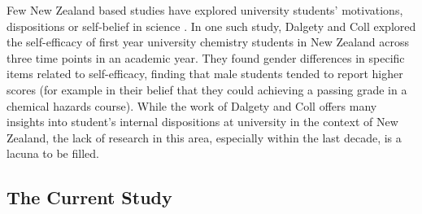 \documentclass[smallextended]{svjour3}       %
\begin{document}
Few New Zealand based studies have explored university students' motivations, dispositions or self-belief in science \cite{dalgety2006exploring,murphy2018determinants}. In one such study, Dalgety and Coll \citeyear{dalgety2006exploring} explored the self-efficacy of first year university chemistry students in New Zealand across three time points in an academic year. They found gender differences in specific items related to self-efficacy, finding that male students tended to report higher scores (for example in their belief that they could achieving a passing grade in a chemical hazards course). While the work of Dalgety and Coll \citeyear{dalgety2006exploring} offers many insights into student's internal dispositions at university in the context of New Zealand, the lack of research in this area, especially within the last decade, is a lacuna to be filled. 


\subsection*{The Current Study}
\label{sec:3}
\end{document}
